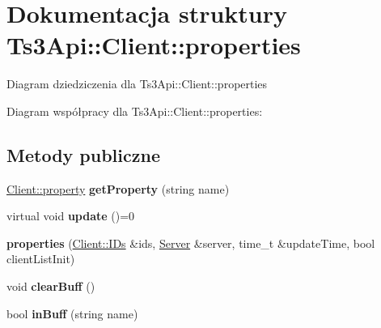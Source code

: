 \hypertarget{struct_ts3_api_1_1_client_1_1properties}{}\section{Dokumentacja struktury Ts3\+Api\+:\+:Client\+:\+:properties}
\label{struct_ts3_api_1_1_client_1_1properties}


Diagram dziedziczenia dla Ts3\+Api\+:\+:Client\+:\+:properties


Diagram współpracy dla Ts3\+Api\+:\+:Client\+:\+:properties\+:
\subsection*{Metody publiczne}
\begin{DoxyCompactItemize}
\item 
\hyperlink{struct_ts3_api_1_1_client_1_1property}{Client\+::property} {\bfseries get\+Property} (string name)\hypertarget{struct_ts3_api_1_1_client_1_1properties_aa6d74e747f534c68b17f807ddc5e3b90}{}\label{struct_ts3_api_1_1_client_1_1properties_aa6d74e747f534c68b17f807ddc5e3b90}

\item 
virtual void {\bfseries update} ()=0\hypertarget{struct_ts3_api_1_1_client_1_1properties_a27d6be3cb0ebc428af28ac9346071ecc}{}\label{struct_ts3_api_1_1_client_1_1properties_a27d6be3cb0ebc428af28ac9346071ecc}

\item 
{\bfseries properties} (\hyperlink{struct_ts3_api_1_1_client_1_1_i_ds}{Client\+::\+I\+Ds} \&ids, \hyperlink{class_ts3_api_1_1_server}{Server} \&server, time\+\_\+t \&update\+Time, bool client\+List\+Init)\hypertarget{struct_ts3_api_1_1_client_1_1properties_a732454780cd5a225d1a1bed8131793bb}{}\label{struct_ts3_api_1_1_client_1_1properties_a732454780cd5a225d1a1bed8131793bb}

\item 
void {\bfseries clear\+Buff} ()\hypertarget{struct_ts3_api_1_1_client_1_1properties_a4402feed4be3b1edf682e96f9d92f460}{}\label{struct_ts3_api_1_1_client_1_1properties_a4402feed4be3b1edf682e96f9d92f460}

\item 
bool {\bfseries in\+Buff} (string name)\hypertarget{struct_ts3_api_1_1_client_1_1properties_a3b0b711b9b79681ce07f04d194e82048}{}\label{struct_ts3_api_1_1_client_1_1properties_a3b0b711b9b79681ce07f04d194e82048}

\end{DoxyCompactItemize}
